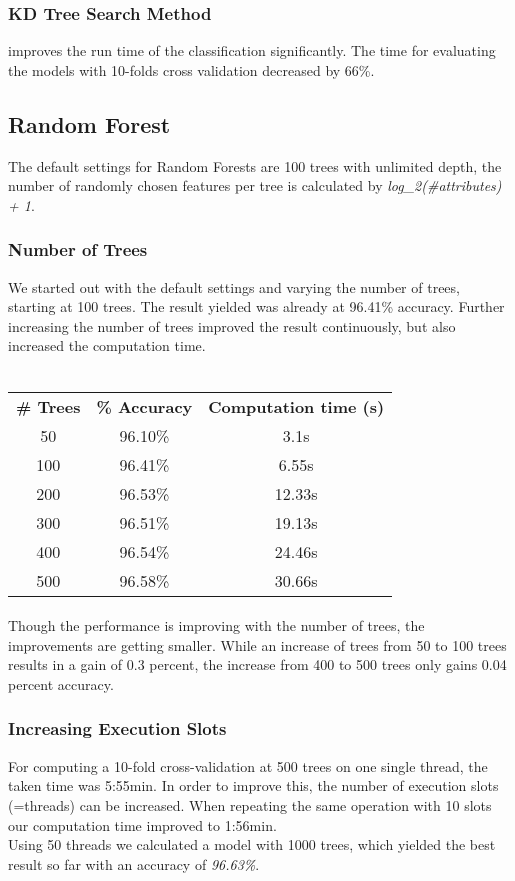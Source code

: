 \documentclass{article}
\begin{document}
\subsubsection{KD Tree Search Method} improves the run time of the classification significantly. The time for evaluating the models with 10-folds cross validation decreased by 66\%. 

\subsection{Random Forest}
The default settings for Random Forests are 100 trees with unlimited depth, the number of randomly chosen features per tree is calculated by \textit{log\_2(\#attributes) + 1}.
\subsubsection{Number of Trees} We started out with the default settings and varying the number of trees, starting at 100 trees. The result yielded was already at 96.41\% accuracy. Further increasing the number of trees improved the result continuously, but also increased the computation time. 
\\\\
\begin{center}
\begin{tabular}{ c | c | c }
\textbf{\# Trees} & \textbf{\% Accuracy} & \textbf{Computation time (s)} \\
50 & 96.10\% & 3.1s \\
100 & 96.41\% & 6.55s \\
200 & 96.53\% & 12.33s \\
300 & 96.51\% & 19.13s \\
400 & 96.54\% & 24.46s \\
500 & 96.58\% & 30.66s\\
\end{tabular}
\end{center}


\paragraph{}Though the performance is improving with the number of trees, the improvements are getting smaller. While an increase of trees from 50 to 100 trees results in a gain of 0.3 percent, the increase from 400 to 500 trees only gains 0.04 percent accuracy. 
\subsubsection{Increasing Execution Slots}For computing a 10-fold cross-validation at 500 trees on one single thread, the taken time was 5:55min. In order to improve this, the number of execution slots (=threads) can be increased. When repeating the same operation with 10 slots our computation time improved to 1:56min. \\
Using 50 threads we calculated a model with 1000 trees, which yielded the best result so far with an accuracy of \emph{96.63\%}. 
\end{document}
